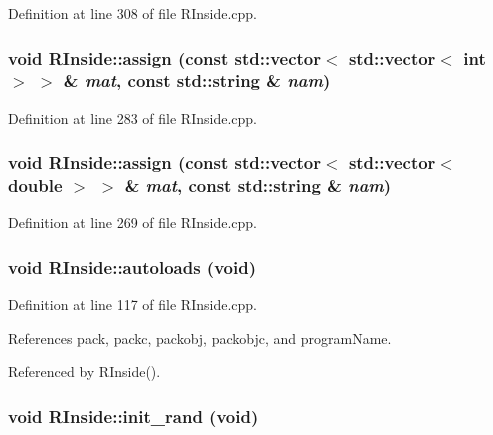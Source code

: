 Definition at line 308 of file RInside.cpp.\hypertarget{classRInside_abae6700c75661cfb635859ac3d3c50d1}{
\subsubsection[{assign}]{\setlength{\rightskip}{0pt plus 5cm}void RInside::assign (const std::vector$<$ std::vector$<$ int $>$ $>$ \& {\em mat}, \/  const std::string \& {\em nam})}}
\label{classRInside_abae6700c75661cfb635859ac3d3c50d1}


Definition at line 283 of file RInside.cpp.\hypertarget{classRInside_aedd5db3eb2bcc97a93914088d599c8b4}{
\subsubsection[{assign}]{\setlength{\rightskip}{0pt plus 5cm}void RInside::assign (const std::vector$<$ std::vector$<$ double $>$ $>$ \& {\em mat}, \/  const std::string \& {\em nam})}}
\label{classRInside_aedd5db3eb2bcc97a93914088d599c8b4}


Definition at line 269 of file RInside.cpp.\hypertarget{classRInside_a41c250f2ef249a02a0d32e761628d943}{
\subsubsection[{autoloads}]{\setlength{\rightskip}{0pt plus 5cm}void RInside::autoloads (void)}}
\label{classRInside_a41c250f2ef249a02a0d32e761628d943}


Definition at line 117 of file RInside.cpp.

References pack, packc, packobj, packobjc, and programName.

Referenced by RInside().\hypertarget{classRInside_af9920dd157552b7a5dce8573574ce78d}{
\subsubsection[{init\_\-rand}]{\setlength{\rightskip}{0pt plus 5cm}void RInside::init\_\-rand (void)}}
\label{classRInside_af9920dd157552b7a5dce8573574ce78d}


